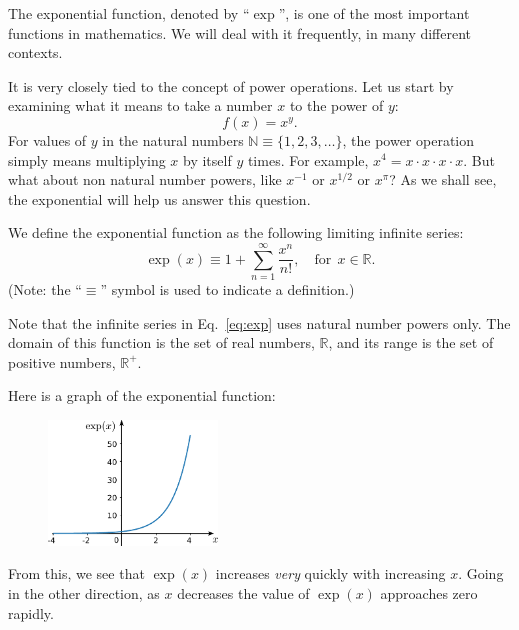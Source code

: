 \documentclass[10pt,a4paper]{article}
\begin{document}
The exponential function, denoted by ``$\exp$'', is one of the most
important functions in mathematics. We will deal with it frequently,
in many different contexts.

It is very closely tied to the concept of power operations. Let us
start by examining what it means to take a number $x$ to the power of
$y$:
\begin{equation}
  f(x) = x^y.
\end{equation}
For values of $y$ in the natural numbers $\mathbb{N} \equiv
\{1,2,3,\dots\}$, the power operation simply means multiplying $x$ by
itself $y$ times.  For example, $x^4 = x \cdot x \cdot x \cdot x$.
But what about non natural number powers, like $x^{-1}$ or $x^{1/2}$
or $x^{\pi}$? As we shall see, the exponential will help us answer
this question.

We define the exponential function as the following limiting infinite series:
\begin{equation}
  \exp(x) \equiv 1 + \sum_{n=1}^\infty\frac{x^n}{n!}, \quad\mathrm{for}\;\, x \in \mathbb{R}.
  \label{eq:exp}
\end{equation}
(Note: the ``$\equiv$'' symbol is used to indicate a definition.)

Note that the infinite series in Eq.~\eqref{eq:exp} uses natural
number powers only.  The domain of this function is the set of real
numbers, $\mathbb{R}$, and its range is the set of positive numbers,
$\mathbb{R}^+$.

\clearpage
Here is a graph of the exponential function:

\begin{figure}[ht]
  \centering\includegraphics[width=0.4\textwidth]{exponential}
\end{figure}

\label{exponential-properties}

From this, we see that $\exp(x)$ increases \textit{very} quickly with
increasing $x$.  Going in the other direction, as $x$ decreases the
value of $\exp(x)$ approaches zero rapidly.
\end{document}

